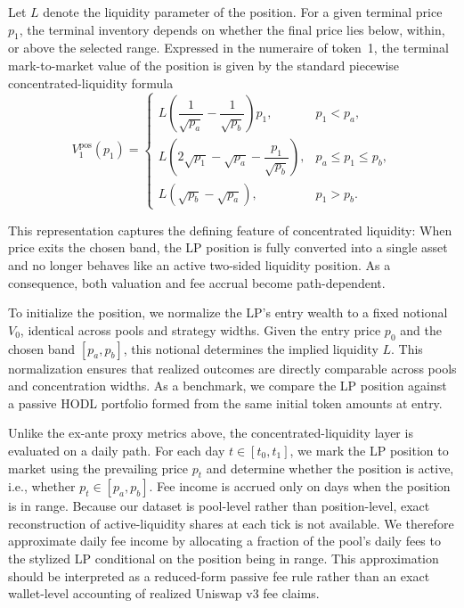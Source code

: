 \documentclass[10pt,conference,compsocconf]{IEEEtran}
\begin{document}
{Let $L$ denote the liquidity parameter of the position. For a given terminal price $p_1$, the terminal inventory depends on whether the final price lies below, within, or above the selected range. Expressed in the numeraire of token~1, the terminal mark-to-market value of the position is given by the standard piecewise concentrated-liquidity formula}
\begin{equation}
\label{eq:v3_terminal_value}
V^{\mathrm{pos}}_1(p_1)=
\begin{cases}
L\left(\dfrac{1}{\sqrt{p_a}}-\dfrac{1}{\sqrt{p_b}}\right)p_1, & p_1 < p_a,\\[1.0em]
L\left(2\sqrt{p_1}-\sqrt{p_a}-\dfrac{p_1}{\sqrt{p_b}}\right), & p_a \le p_1 \le p_b,\\[1.0em]
L\left(\sqrt{p_b}-\sqrt{p_a}\right), & p_1 > p_b.
\end{cases}
\end{equation}

{This representation captures the defining feature of concentrated liquidity: When price exits the chosen band, the LP position is fully converted into a single asset and no longer behaves like an active two-sided liquidity position. As a consequence, both valuation and fee accrual become path-dependent.}

{To initialize the position, we normalize the LP’s entry wealth to a fixed notional $V_0$, identical across pools and strategy widths. Given the entry price $p_0$ and the chosen band $[p_a,p_b]$, this notional determines the implied liquidity $L$. This normalization ensures that realized outcomes are directly comparable across pools and concentration widths. As a benchmark, we compare the LP position against a passive HODL portfolio formed from the same initial token amounts at entry.}

{Unlike the ex-ante proxy metrics above, the concentrated-liquidity layer is evaluated on a daily path. For each day $t \in [t_0,t_1]$, we mark the LP position to market using the prevailing price $p_t$ and determine whether the position is active, i.e., whether $p_t \in [p_a,p_b]$. Fee income is accrued only on days when the position is in range. Because our dataset is pool-level rather than position-level, exact reconstruction of active-liquidity shares at each tick is not available. We therefore approximate daily fee income by allocating a fraction of the pool’s daily fees to the stylized LP conditional on the position being in range. This approximation should be interpreted as a reduced-form passive fee rule rather than an exact wallet-level accounting of realized Uniswap v3 fee claims.}
\end{document}
